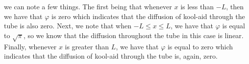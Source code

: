 \documentclass[executivepaper]{article}
\begin{document}
\begin{flushleft}
\begin{center}
\pagebreak

\vspace*{-40mm}

we can note a few things. The first being that whenever $x$ is less than $-L$, then we have that $\varphi$ is zero which indicates that the diffusion of kool-aid through the tube is also zero. Next, we note that when 
$-L \leq x \leq L$, we have that $\varphi$ is equal to $\sqrt{\pi}$, so we know that the diffusion throughout the tube in this case is linear. Finally, whenever $x$ is greater than $L$, we have that $\varphi$ is equal to zero which indicates that the diffusion of kool-aid through the tube is, again, zero.

\end{center}

\end{flushleft}
\end{document}
